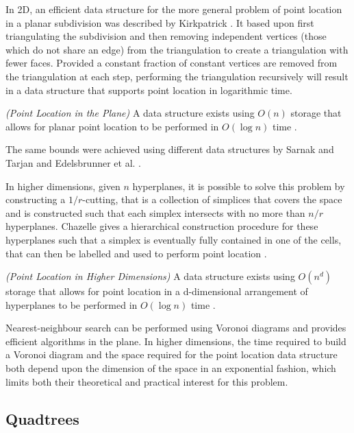 \documentclass[mcs]{scsthesis}
\begin{document}
In 2D, an efficient data structure for the more general problem of point
location in a planar subdivision was described by Kirkpatrick
\cite{kirkpatrick}. It based upon first triangulating the subdivision and then
removing independent vertices (those which do not share an edge) from the
triangulation to create a triangulation with fewer faces. Provided a constant
fraction of constant vertices are removed from the triangulation at each step,
performing the triangulation recursively will result in a data structure that
supports point location in logarithmic time.

\begin{thm} \emph{(Point Location in the Plane)}
A data structure exists using \(O(n)\) storage that allows for planar
point location to be performed in \(O(\log n)\) time \cite{kirkpatrick}.
\end{thm}

The same bounds were achieved using different data structures by Sarnak and
Tarjan \cite{sarnak} and Edelsbrunner et al. \cite{edelsbrunner}.

In higher dimensions, given $n$ hyperplanes, it is possible to solve this problem
by constructing a \(1/r\)-cutting, that is a collection of simplices that
covers the space and is constructed such that each simplex intersects with no
more than \(n/r\) hyperplanes. Chazelle gives a hierarchical construction
procedure for these hyperplanes such that a simplex is eventually fully
contained in one of the cells, that can then be labelled and used to perform
point location \cite{chazelle}.

\begin{thm} \emph{(Point Location in Higher Dimensions)}
A data structure exists using \(O(n^d)\) storage that allows for  
point location in a d-dimensional arrangement of hyperplanes to be performed in
\(O(\log n)\) time \cite{chazelle}.
\end{thm}

Nearest-neighbour search can be performed using Voronoi diagrams and provides
efficient algorithms in the plane. In higher dimensions, the time required to
build a Voronoi diagram and the space required for the point location data
structure both depend upon the dimension of the space in an exponential fashion,
which limits both their theoretical and practical interest for this problem.

\subsection{Quadtrees}
\end{document}
